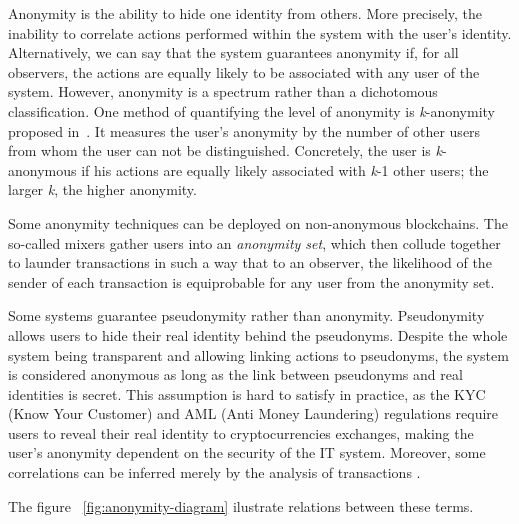 \documentclass{ieeeaccess}
\begin{document}
Anonymity is the ability to hide one identity from others. More precisely, the inability to correlate actions performed within the system with the user's identity. Alternatively, we can say that the system guarantees anonymity if, for all observers, the actions are equally likely to be associated with any user of the system. However, anonymity is a spectrum rather than a dichotomous classification. One method of quantifying the level of anonymity is \textit{k}-anonymity proposed in~\cite{sweeneyKanonymityModelProtecting2002}. It measures the user's anonymity by the number of other users from whom the user can not be distinguished. Concretely, the user is \textit{k}-anonymous if his actions are equally likely associated with \textit{k}-1 other users; the larger \textit{k}, the higher anonymity.

Some anonymity techniques can be deployed on non-anonymous blockchains. The so-called mixers gather users into an \textit{anonymity set}, which then collude together to launder transactions in such a way that to an observer, the likelihood of the sender of each transaction is equiprobable for any user from the anonymity set.

Some systems guarantee pseudonymity rather than anonymity. Pseudonymity allows users to hide their real identity behind the pseudonyms. Despite the whole system being transparent and allowing linking actions to pseudonyms, the system is considered anonymous as long as the link between pseudonyms and real identities is secret. This assumption is hard to satisfy in practice, as the KYC (Know Your Customer) and AML (Anti Money Laundering) regulations require users to reveal their real identity to cryptocurrencies exchanges, making the user's anonymity dependent on the security of the IT system. Moreover, some correlations can be inferred merely by the analysis of transactions \cite{androulakiEvaluatingUserPrivacy2013, oberStructureAnonymityBitcoin2013}.

The figure ~\ref{fig:anonymity-diagram} ilustrate relations between these terms.
\end{document}
